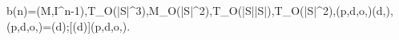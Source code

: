 b(n)=\min\!\left(M,I^{n-1}\right),\qquad T_{}\in O(|S|^3),\quad M_{}\in O(|S|^2),\qquad T_{}\in O(|S|\log|S|),\quad T_{}\in O(|S|^2),\qquad {}(p,d,o,\iota)\longrightarrow{}(d,),\qquad {}(p,d,o,\iota)=(d);[(d)]\mathbin{+\!+}(p,d,o,\iota).
